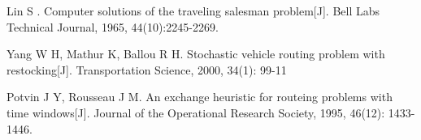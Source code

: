 \documentclass[withoutpreface,bwprint]{cumcmthesis} %
\begin{document}
%
\begin{thebibliography}{99}
	 Lin S . Computer solutions of the traveling salesman problem[J]. Bell Labs Technical Journal, 1965, 44(10):2245-2269.
	
	 Yang W H, Mathur K, Ballou R H. Stochastic vehicle routing problem with restocking[J]. Transportation Science, 2000, 34(1): 99-11
	
	 Potvin J Y, Rousseau J M. An exchange heuristic for routeing problems with time windows[J]. Journal of the Operational Research Society, 1995, 46(12): 1433-1446.

\end{thebibliography}
\end{document}
